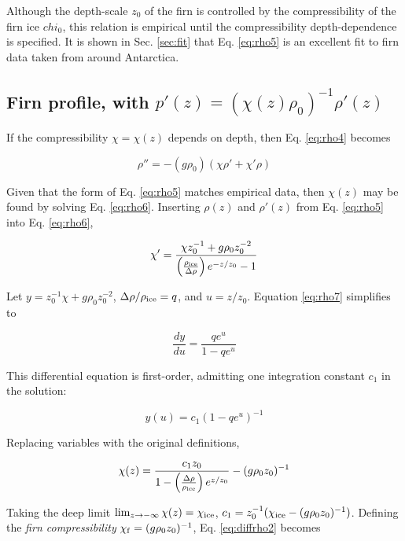 \documentclass[12pt]{article}
\begin{document}
Although the depth-scale $z_0$ of the firn is controlled by the compressibility of the firn ice $chi_0$, this relation is empirical until the compressibility depth-dependence is specified.  It is shown in Sec. \ref{sec:fit} that Eq. \ref{eq:rho5} is an excellent fit to firn data taken from around Antarctica.

\subsection{Firn profile, with $p'(z) = (\chi(z)\rho_0)^{-1} \rho'(z)$}
\label{sec:firn2}

If the compressibility $\chi=\chi(z)$ depends on depth, then Eq. \ref{eq:rho4} becomes

\begin{equation}
\rho'' = -(g\rho_0)(\chi\rho'+\chi'\rho)
\label{eq:rho6}
\end{equation}

Given that the form of Eq. \ref{eq:rho5} matches empirical data, then $\chi(z)$ may be found by solving Eq. \ref{eq:rho6}.  Inserting $\rho(z)$ and $\rho'(z)$ from Eq. \ref{eq:rho5} into Eq. \ref{eq:rho6},

\begin{equation}
\chi' = \frac{\chi z_0^{-1} + g\rho_0z_0^{-2}}{\left(\frac{\rho_{\rm ice}}{\Delta\rho}\right)e^{-z/z_0} - 1}
\label{eq:rho7}
\end{equation}

Let $y = z_0^{-1} \chi + g\rho_0 z_0^{-2}$, $\Delta\rho/\rho_{\rm ice} = q$, and $u = z/z_0$.  Equation \ref{eq:rho7} simplifies to

\begin{equation}
\frac{dy}{du} = \frac{q e^{u}}{1-q e^{u}}
\label{eq:diffrho1}
\end{equation}

This differential equation is first-order, admitting one integration constant $c_1$ in the solution:

\begin{equation}
y(u) = c_1(1-qe^u)^{-1}
\label{eq:diffrho2}
\end{equation}

Replacing variables with the original definitions,

\begin{equation}
\chi(z) = \frac{c_1z_0}{1-\left(\frac{\Delta\rho}{\rho_{\rm ice}}\right)e^{z/z_0}} - (g\rho_0z_0)^{-1}
\end{equation}

Taking the deep limit $\lim_{z\to-\infty} \chi(z) = \chi_{\rm ice}$, $c_1 = z_0^{-1}(\chi_{\rm ice}-(g\rho_0z_0)^{-1})$.  Defining the \textit{firn compressibility} $\chi_{\rm f} = (g\rho_0z_0)^{-1}$, Eq. \ref{eq:diffrho2} becomes
\end{document}
